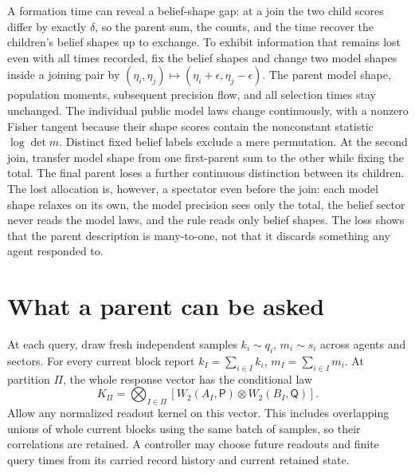 A formation time can reveal a belief-shape gap: at a join the two child scores differ by exactly $\delta$, so the parent sum, the counts, and the time recover the children's belief shapes up to exchange. To exhibit information that remains lost even with all times recorded, fix the belief shapes and change two model shapes inside a joining pair by $(\eta_i,\eta_j)\mapsto(\eta_i+\epsilon,\eta_j-\epsilon)$. The parent model shape, population moments, subsequent precision flow, and all selection times stay unchanged. The individual public model laws change continuously, with a nonzero Fisher tangent because their shape scores contain the nonconstant statistic $\log\det m$. Distinct fixed belief labels exclude a mere permutation. At the second join, transfer model shape from one first-parent sum to the other while fixing the total. The final parent loses a further continuous distinction between its children. The lost allocation is, however, a spectator even before the join: each model shape relaxes on its own, the model precision sees only the total, the belief sector never reads the model laws, and the rule reads only belief shapes. The loss shows that the parent description is many-to-one, not that it discards something any agent responded to.

\section{What a parent can be asked}
\label{cf:responses}

At each query, draw fresh independent samples $k_i\sim q_i$, $m_i\sim s_i$ across agents and sectors. For every current block report $k_I=\sum_{i\in I}k_i$, $m_I=\sum_{i\in I}m_i$. At partition $\Pi$, the whole response vector has the conditional law
\begin{equation}
 K_\Pi=\bigotimes_{I\in\Pi}
 \left[W_2(A_I,\mathsf P)\otimes W_2(B_I,\mathsf Q)\right].
 \label{cf:response-kernel}
\end{equation}
Allow any normalized readout kernel on this vector. This includes overlapping unions of whole current blocks using the same batch of samples, so their correlations are retained. A controller may choose future readouts and finite query times from its carried record history and current retained state.

